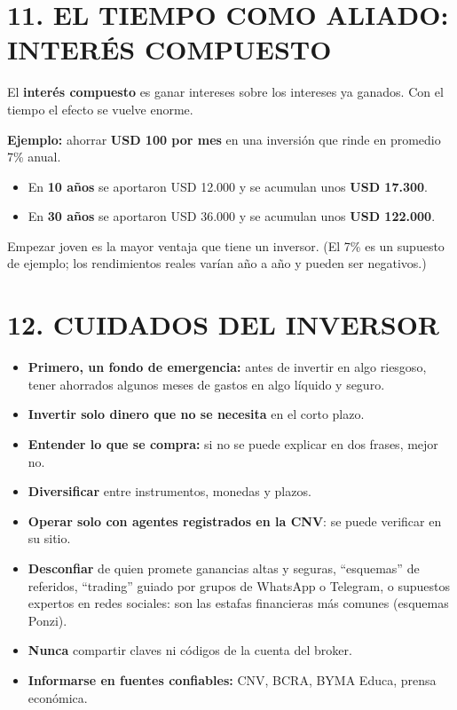 \section*{11. EL TIEMPO COMO ALIADO: INTERÉS COMPUESTO}

El \textbf{interés compuesto} es ganar intereses sobre los intereses ya ganados. Con el tiempo
el efecto se vuelve enorme.

\begin{recuadro}
\textbf{Ejemplo:} ahorrar \textbf{USD 100 por mes} en una inversión que rinde en promedio 7\%
anual.
\begin{itemize}[leftmargin=*,nosep]
  \item En \textbf{10 años} se aportaron USD 12.000 y se acumulan unos \textbf{USD 17.300}.
  \item En \textbf{30 años} se aportaron USD 36.000 y se acumulan unos \textbf{USD 122.000}.
\end{itemize}
Empezar joven es la mayor ventaja que tiene un inversor. (El 7\% es un supuesto de ejemplo; los
rendimientos reales varían año a año y pueden ser negativos.)
\end{recuadro}

\section*{12. CUIDADOS DEL INVERSOR}

\begin{itemize}
  \item \textbf{Primero, un fondo de emergencia:} antes de invertir en algo riesgoso, tener
        ahorrados algunos meses de gastos en algo líquido y seguro.
  \item \textbf{Invertir solo dinero que no se necesita} en el corto plazo.
  \item \textbf{Entender lo que se compra:} si no se puede explicar en dos frases, mejor no.
  \item \textbf{Diversificar} entre instrumentos, monedas y plazos.
  \item \textbf{Operar solo con agentes registrados en la CNV}: se puede verificar en su sitio.
  \item \textbf{Desconfiar} de quien promete ganancias altas y seguras, ``esquemas'' de
        referidos, ``trading'' guiado por grupos de WhatsApp o Telegram, o supuestos expertos
        en redes sociales: son las estafas financieras más comunes (esquemas Ponzi).
  \item \textbf{Nunca} compartir claves ni códigos de la cuenta del broker.
  \item \textbf{Informarse en fuentes confiables:} CNV, BCRA, BYMA Educa, prensa económica.
\end{itemize}

